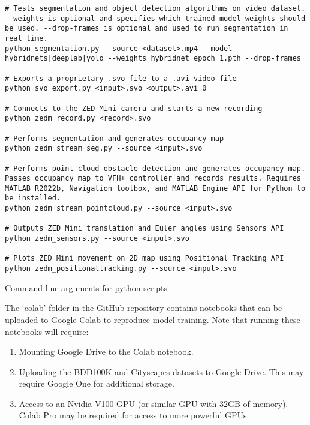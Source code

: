 \begin{listing}[H]
\begin{verbatim}
# Tests segmentation and object detection algorithms on video dataset. --weights is optional and specifies which trained model weights should be used. --drop-frames is optional and used to run segmentation in real time.
python segmentation.py --source <dataset>.mp4 --model hybridnets|deeplab|yolo --weights hybridnet_epoch_1.pth --drop-frames

# Exports a proprietary .svo file to a .avi video file
python svo_export.py <input>.svo <output>.avi 0

# Connects to the ZED Mini camera and starts a new recording
python zedm_record.py <record>.svo

# Performs segmentation and generates occupancy map
python zedm_stream_seg.py --source <input>.svo

# Performs point cloud obstacle detection and generates occupancy map. Passes occupancy map to VFH+ controller and records results. Requires MATLAB R2022b, Navigation toolbox, and MATLAB Engine API for Python to be installed.
python zedm_stream_pointcloud.py --source <input>.svo

# Outputs ZED Mini translation and Euler angles using Sensors API
python zedm_sensors.py --source <input>.svo

# Plots ZED Mini movement on 2D map using Positional Tracking API
python zedm_positionaltracking.py --source <input>.svo
\end{verbatim}
\caption{Command line arguments for python scripts}
\label{lst:script_examples}
\end{listing}

\pagebreak
The `colab' folder in the GitHub repository contains notebooks that
can be uploaded to Google Colab to reproduce model training.
Note that running these notebooks will require:
\begin{enumerate}
    \item Mounting Google Drive to the Colab notebook.
    \item Uploading the BDD100K and Cityscapes datasets to Google Drive. This may require Google One for additional storage.
    \item Access to an Nvidia V100 GPU (or similar GPU with 32GB of memory). Colab Pro may be required for access to more powerful GPUs.
\end{enumerate}
